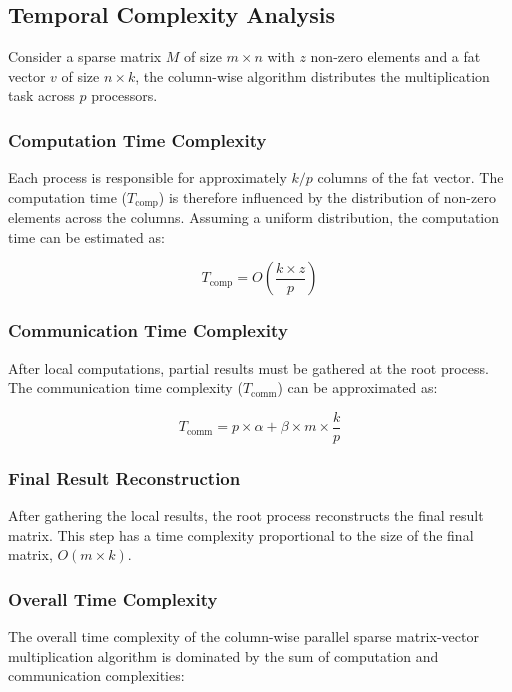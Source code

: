 \documentclass[12pt,oneside]{book} %
\begin{document}
\subsection{Temporal Complexity Analysis}
Consider a sparse matrix $M$ of size $m \times n$ with $z$ non-zero elements
and a fat vector $v$ of size $n \times k$, the column-wise algorithm
distributes the multiplication task across $p$ processors.

\subsubsection{Computation Time Complexity}
Each process is responsible for approximately \(k/p\) columns of the fat
vector. The computation time (\(T_{\text{comp}}\)) is therefore influenced by
the distribution of non-zero elements across the columns. Assuming a uniform
distribution, the computation time can be estimated as:

\begin{equation}
    T_{\text{comp}} = O\left(\frac{k \times z}{p}\right)
\end{equation}

\subsubsection{Communication Time Complexity}

After local computations, partial results must be gathered at the root process.
The communication time complexity (\(T_{\text{comm}}\)) can be approximated as:

\begin{equation}
    T_{\text{comm}} = p \times \alpha + \beta \times m \times \frac{k}{p}
\end{equation}

\subsubsection{Final Result Reconstruction}
After gathering the local results, the root process reconstructs the final
result matrix. This step has a time complexity proportional to the size of the
final matrix, \(O(m \times k)\).

\subsubsection{Overall Time Complexity}

The overall time complexity of the column-wise parallel sparse matrix-vector
multiplication algorithm is dominated by the sum of computation and
communication complexities:
\end{document}
